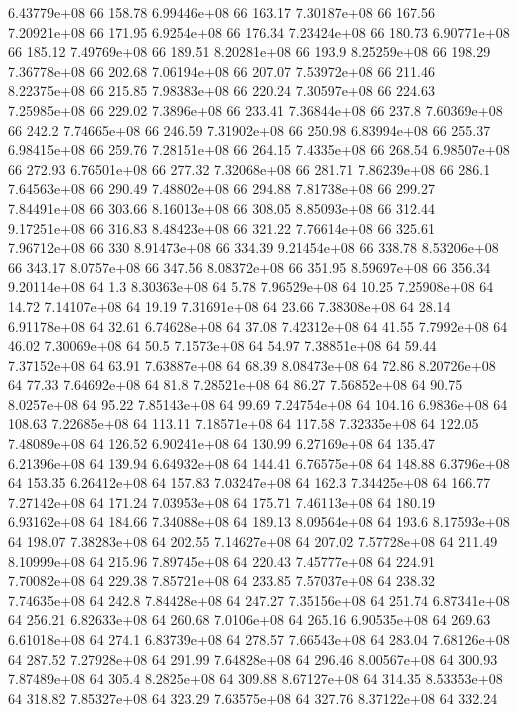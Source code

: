 6.43779e+08 66 158.78
6.99446e+08 66 163.17
7.30187e+08 66 167.56
7.20921e+08 66 171.95
6.9254e+08 66 176.34
7.23424e+08 66 180.73
6.90771e+08 66 185.12
7.49769e+08 66 189.51
8.20281e+08 66 193.9
8.25259e+08 66 198.29
7.36778e+08 66 202.68
7.06194e+08 66 207.07
7.53972e+08 66 211.46
8.22375e+08 66 215.85
7.98383e+08 66 220.24
7.30597e+08 66 224.63
7.25985e+08 66 229.02
7.3896e+08 66 233.41
7.36844e+08 66 237.8
7.60369e+08 66 242.2
7.74665e+08 66 246.59
7.31902e+08 66 250.98
6.83994e+08 66 255.37
6.98415e+08 66 259.76
7.28151e+08 66 264.15
7.4335e+08 66 268.54
6.98507e+08 66 272.93
6.76501e+08 66 277.32
7.32068e+08 66 281.71
7.86239e+08 66 286.1
7.64563e+08 66 290.49
7.48802e+08 66 294.88
7.81738e+08 66 299.27
7.84491e+08 66 303.66
8.16013e+08 66 308.05
8.85093e+08 66 312.44
9.17251e+08 66 316.83
8.48423e+08 66 321.22
7.76614e+08 66 325.61
7.96712e+08 66 330
8.91473e+08 66 334.39
9.21454e+08 66 338.78
8.53206e+08 66 343.17
8.0757e+08 66 347.56
8.08372e+08 66 351.95
8.59697e+08 66 356.34
9.20114e+08 64 1.3
8.30363e+08 64 5.78
7.96529e+08 64 10.25
7.25908e+08 64 14.72
7.14107e+08 64 19.19
7.31691e+08 64 23.66
7.38308e+08 64 28.14
6.91178e+08 64 32.61
6.74628e+08 64 37.08
7.42312e+08 64 41.55
7.7992e+08 64 46.02
7.30069e+08 64 50.5
7.1573e+08 64 54.97
7.38851e+08 64 59.44
7.37152e+08 64 63.91
7.63887e+08 64 68.39
8.08473e+08 64 72.86
8.20726e+08 64 77.33
7.64692e+08 64 81.8
7.28521e+08 64 86.27
7.56852e+08 64 90.75
8.0257e+08 64 95.22
7.85143e+08 64 99.69
7.24754e+08 64 104.16
6.9836e+08 64 108.63
7.22685e+08 64 113.11
7.18571e+08 64 117.58
7.32335e+08 64 122.05
7.48089e+08 64 126.52
6.90241e+08 64 130.99
6.27169e+08 64 135.47
6.21396e+08 64 139.94
6.64932e+08 64 144.41
6.76575e+08 64 148.88
6.3796e+08 64 153.35
6.26412e+08 64 157.83
7.03247e+08 64 162.3
7.34425e+08 64 166.77
7.27142e+08 64 171.24
7.03953e+08 64 175.71
7.46113e+08 64 180.19
6.93162e+08 64 184.66
7.34088e+08 64 189.13
8.09564e+08 64 193.6
8.17593e+08 64 198.07
7.38283e+08 64 202.55
7.14627e+08 64 207.02
7.57728e+08 64 211.49
8.10999e+08 64 215.96
7.89745e+08 64 220.43
7.45777e+08 64 224.91
7.70082e+08 64 229.38
7.85721e+08 64 233.85
7.57037e+08 64 238.32
7.74635e+08 64 242.8
7.84428e+08 64 247.27
7.35156e+08 64 251.74
6.87341e+08 64 256.21
6.82633e+08 64 260.68
7.0106e+08 64 265.16
6.90535e+08 64 269.63
6.61018e+08 64 274.1
6.83739e+08 64 278.57
7.66543e+08 64 283.04
7.68126e+08 64 287.52
7.27928e+08 64 291.99
7.64828e+08 64 296.46
8.00567e+08 64 300.93
7.87489e+08 64 305.4
8.2825e+08 64 309.88
8.67127e+08 64 314.35
8.53353e+08 64 318.82
7.85327e+08 64 323.29
7.63575e+08 64 327.76
8.37122e+08 64 332.24
